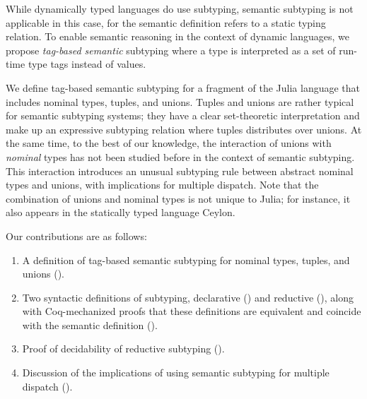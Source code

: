 While dynamically typed languages do use subtyping,
semantic subtyping is not applicable in this case,
for the semantic definition refers to a static typing relation.
To enable semantic reasoning in the context of dynamic languages,
we propose \emph{tag-based semantic} subtyping
where a type is interpreted as a set of run-time type tags 
instead of values. %

We define tag-based semantic subtyping for a fragment of the Julia language 
that includes nominal types, tuples, and unions.
Tuples and unions are rather typical for semantic subtyping systems;
they have a clear set-theoretic interpretation 
and make up an expressive subtyping relation
where tuples distributes over unions.
At the same time, to the best of our knowledge,
the interaction of unions with \emph{nominal} types has not been studied before
in the context of semantic subtyping.
This interaction introduces
an unusual subtyping rule between abstract nominal types and unions,
with implications for multiple dispatch.
Note that the combination of unions and nominal types is not unique to Julia;
for instance, it also appears in the statically typed language Ceylon.

Our contributions are as follows:
\begin{enumerate}
  \item A definition of tag-based semantic subtyping for 
    nominal types, tuples, and unions ().
  \item Two syntactic definitions of subtyping, 
    declarative () and reductive (),
    along with Coq-mechanized proofs that these definitions are equivalent
    and coincide with the semantic definition (). 	
  \item Proof of decidability of reductive subtyping ().
  \item Discussion of the implications of using semantic subtyping
    for multiple dispatch ().
\end{enumerate}






